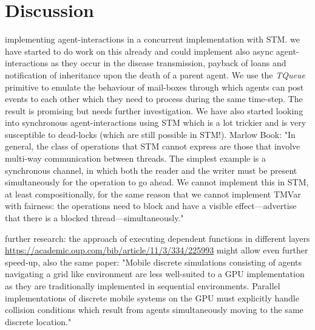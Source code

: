 \section{Discussion}
implementing agent-interactions in a concurrent implementation with STM. we have started to do work on this already and could implement also async agent-interactions as they occur in the disease transmission, payback of loans and notification of inheritance upon the death of a parent agent. We use the \textit{TQueue} primitive to emulate the behaviour of mail-boxes through which agents can post events to each other which they need to process during the same time-step. The result is promising but needs further investigation. We have also started looking into synchronous agent-interactions using STM which is a lot trickier and is very susceptible to dead-locks (which are still possible in STM!).
Marlow Book: "In general, the class of operations that STM cannot express are those that involve multi-way communication between threads. The simplest example is a synchronous channel, in which both the reader and the writer must be present simultaneously for the operation to go ahead. We cannot implement this in STM, at least compositionally, for the same reason that we cannot implement TMVar with fairness: the operations need to block and have a visible effect—advertise that there is a blocked thread—simultaneously."


further research: the approach of executing dependent functions in different layers \url{https://academic.oup.com/bib/article/11/3/334/225993} might allow even further speed-up, also the same paper: "Mobile discrete simulations consisting of agents navigating a grid like environment are less well-suited to a GPU implementation as they are traditionally implemented in sequential environments. Parallel implementations of discrete mobile systems on the GPU must explicitly handle collision conditions which result from agents simultaneously moving to the same discrete location."